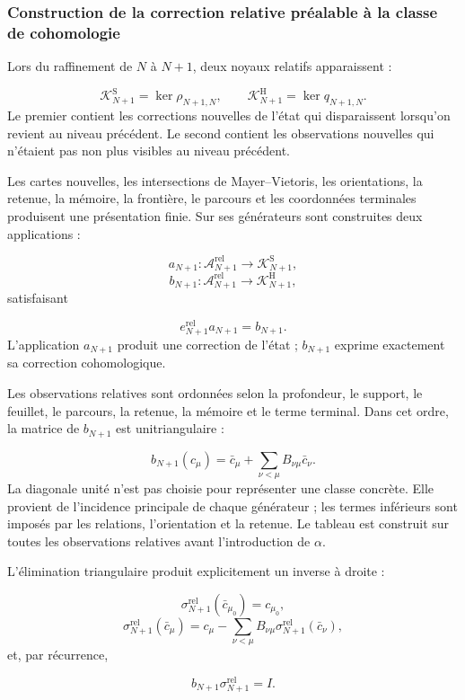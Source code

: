 \subsubsection{Construction de la correction relative préalable à la classe de cohomologie}
Lors du raffinement de \(N\) à \(N+1\), deux noyaux relatifs apparaissent :\par
\[
\mathscr K_{N+1}^{\mathrm S}
=
\ker\rho_{N+1,N},
\qquad
\mathscr K_{N+1}^{\mathrm H}
=
\ker q_{N+1,N}.
\]
Le premier contient les corrections nouvelles de l’état qui disparaissent lorsqu’on revient au niveau précédent. Le second contient les observations nouvelles qui n’étaient pas non plus visibles au niveau précédent.\par
Les cartes nouvelles, les intersections de Mayer–Vietoris, les orientations, la retenue, la mémoire, la frontière, le parcours et les coordonnées terminales produisent une présentation finie. Sur ses générateurs sont construites deux applications :\par
\[
a_{N+1}:
\mathscr A_{N+1}^{\mathrm{rel}}
\longrightarrow
\mathscr K_{N+1}^{\mathrm S},
\]
\[
b_{N+1}:
\mathscr A_{N+1}^{\mathrm{rel}}
\longrightarrow
\mathscr K_{N+1}^{\mathrm H},
\]
satisfaisant\par
\[
e_{N+1}^{\mathrm{rel}}a_{N+1}=b_{N+1}.
\]
L’application \(a_{N+1}\) produit une correction de l’état ; \(b_{N+1}\) exprime exactement sa correction cohomologique.\par
Les observations relatives sont ordonnées selon la profondeur, le support, le feuillet, le parcours, la retenue, la mémoire et le terme terminal. Dans cet ordre, la matrice de \(b_{N+1}\) est unitriangulaire :\par
\[
b_{N+1}(c_\mu)
=
\bar c_\mu+
\sum_{\nu<\mu}
B_{\nu\mu}\bar c_\nu.
\]
La diagonale unité n’est pas choisie pour représenter une classe concrète. Elle provient de l’incidence principale de chaque générateur ; les termes inférieurs sont imposés par les relations, l’orientation et la retenue. Le tableau est construit sur toutes les observations relatives avant l’introduction de \(\alpha\).\par
L’élimination triangulaire produit explicitement un inverse à droite :\par
\[
\sigma_{N+1}^{\mathrm{rel}}(\bar c_{\mu_0})=c_{\mu_0},
\]
\[
\sigma_{N+1}^{\mathrm{rel}}(\bar c_\mu)
=
c_\mu-
\sum_{\nu<\mu}
B_{\nu\mu}
\sigma_{N+1}^{\mathrm{rel}}(\bar c_\nu),
\]
et, par récurrence,\par
\[
b_{N+1}\sigma_{N+1}^{\mathrm{rel}}=I.
\]

